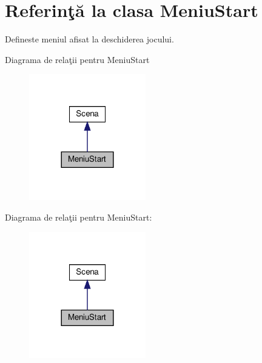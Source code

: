 \hypertarget{classMeniuStart}{}\section{Referinţă la clasa Meniu\+Start}
\label{classMeniuStart}


Defineste meniul afisat la deschiderea jocului.  




Diagrama de relaţii pentru Meniu\+Start
\nopagebreak
\begin{figure}[H]
\begin{center}
\leavevmode
\includegraphics[width=144pt]{classMeniuStart__inherit__graph}
\end{center}
\end{figure}


Diagrama de relaţii pentru Meniu\+Start\+:
\nopagebreak
\begin{figure}[H]
\begin{center}
\leavevmode
\includegraphics[width=144pt]{classMeniuStart__coll__graph}
\end{center}
\end{figure}
